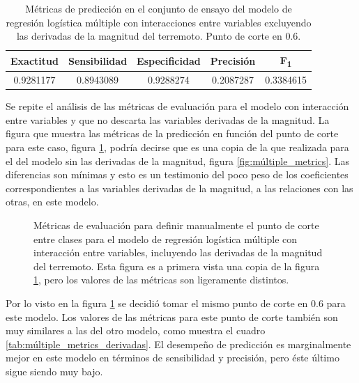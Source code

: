 \documentclass[a4paper]{report}
\begin{document}
\begin{table}[!ht]
	\centering
	\begin{tabular}{ccccc}
	\toprule
	Exactitud & Sensibilidad & Especificidad & Precisión & F\textsubscript{1} \\
	\midrule
	\num{0.9281177} & \num{0.8943089} & \num{0.9288274} & \num{0.2087287} & \num{0.3384615}\\
	\bottomrule
	\end{tabular}
	\caption{Métricas de predicción en el conjunto de ensayo del modelo de regresión logística múltiple con interacciones entre variables excluyendo las derivadas de la magnitud del terremoto. Punto de corte en \num{0.6}.
	}
	\label{tab:múltiple_metrics}
\end{table}

Se repite el análisis de las métricas de evaluación para el modelo con interacción entre variables y que no descarta las variables derivadas de la magnitud.
La figura que muestra las métricas de la predicción en función del punto de corte para este caso, figura \ref{fig:múltiple_metrics_derivadas}, podría decirse que es una copia de la que realizada para el del modelo sin las derivadas de la magnitud, figura \ref{fig:múltiple_metrics}.
Las diferencias son mínimas y esto es un testimonio del poco peso de los coeficientes correspondientes a las variables derivadas de la magnitud, a las relaciones con las otras, en este modelo. 

\begin{figure}[!ht]
	\centering
	
	\vspace{-0.8cm}
	\caption{Métricas de evaluación para definir manualmente el punto de corte entre clases para el modelo de regresión logística múltiple con interacción entre variables, incluyendo las derivadas de la magnitud del terremoto.
	Esta figura es a primera vista una copia de la figura \ref{fig:múltiple_metrics_derivadas}, pero los valores de las métricas son ligeramente distintos.
	}
	\label{fig:múltiple_metrics_derivadas}
\end{figure}

Por lo visto en la figura \ref{fig:múltiple_metrics_derivadas} se decidió tomar el mismo punto de corte en \num{0.6} para este modelo.
Los valores de las métricas para este punto de corte también son muy similares a las del otro modelo, como muestra el cuadro \ref{tab:múltiple_metrics_derivadas}.
El desempeño de predicción es marginalmente mejor en este modelo en términos de sensibilidad y precisión, pero éste último sigue siendo muy bajo.
\end{document}

